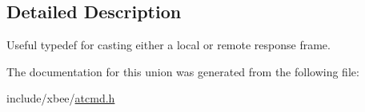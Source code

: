 \subsection{Detailed Description}
Useful typedef for casting either a local or remote response frame. 

The documentation for this union was generated from the following file\-:\begin{DoxyCompactItemize}
\item 
include/xbee/\hyperlink{atcmd_8h}{atcmd.\-h}\end{DoxyCompactItemize}
